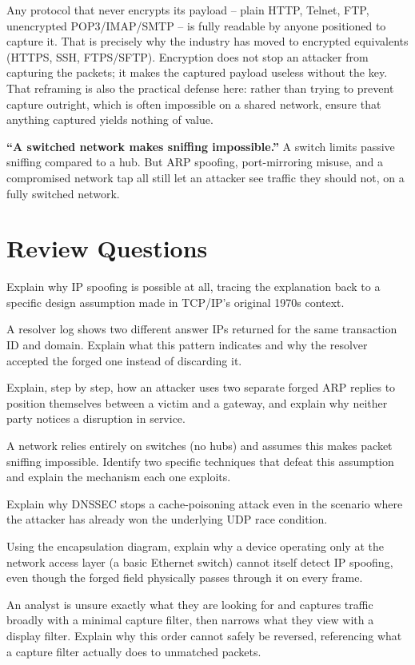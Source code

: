 Any protocol that never encrypts its payload -- plain HTTP, Telnet, FTP, unencrypted POP3/IMAP/SMTP
-- is fully readable by anyone positioned to capture it. That is precisely why the industry has
moved to encrypted equivalents (HTTPS, SSH, FTPS/SFTP). Encryption does not stop an attacker from
capturing the packets; it makes the captured payload useless without the key. That reframing is
also the practical defense here: rather than trying to prevent capture outright, which is often
impossible on a shared network, ensure that anything captured yields nothing of value.

\begin{misconception}
\textbf{``A switched network makes sniffing impossible.''} A switch limits passive sniffing
compared to a hub. But ARP spoofing, port-mirroring misuse, and a compromised network tap all still
let an attacker see traffic they should not, on a fully switched network.
\end{misconception}

\section*{Review Questions}
\begin{reviewquestions}
\item Explain why IP spoofing is possible at all, tracing the explanation back to a specific design
assumption made in TCP/IP's original 1970s context.
\item A resolver log shows two different answer IPs returned for the same transaction ID and
domain. Explain what this pattern indicates and why the resolver accepted the forged one instead
of discarding it.
\item Explain, step by step, how an attacker uses two separate forged ARP replies to position
themselves between a victim and a gateway, and explain why neither party notices a disruption in
service.
\item A network relies entirely on switches (no hubs) and assumes this makes packet sniffing
impossible. Identify two specific techniques that defeat this assumption and explain the
mechanism each one exploits.
\item Explain why DNSSEC stops a cache-poisoning attack even in the scenario where the attacker has
already won the underlying UDP race condition.
\item Using the encapsulation diagram, explain why a device operating only at the network access
layer (a basic Ethernet switch) cannot itself detect IP spoofing, even though the forged field
physically passes through it on every frame.
\item An analyst is unsure exactly what they are looking for and captures traffic broadly with a
minimal capture filter, then narrows what they view with a display filter. Explain why this order
cannot safely be reversed, referencing what a capture filter actually does to unmatched packets.
\end{reviewquestions}

